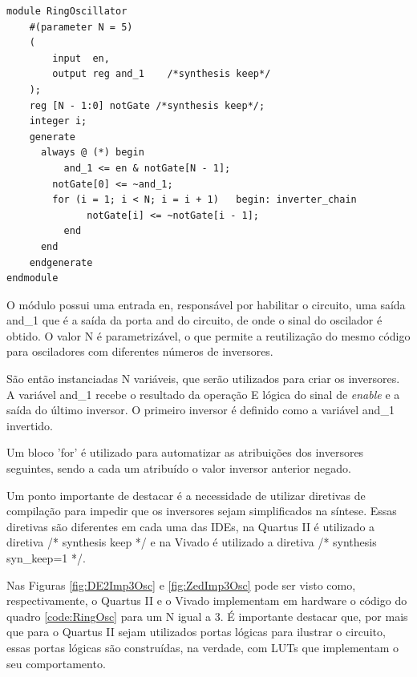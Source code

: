 \begin{lstlisting}[label={code:RingOsc}, style=VerilogStyle, caption={Módulo do Oscilador em Anel. Fonte: O Autor}]
module RingOscillator 
	#(parameter N = 5)
	(
		input  en,
		output reg and_1    /*synthesis keep*/
	);
	reg [N - 1:0] notGate /*synthesis keep*/;
	integer i;
	generate
	  always @ (*) begin
		  and_1 <= en & notGate[N - 1];
	  	notGate[0] <= ~and_1;
	  	for (i = 1; i < N; i = i + 1)   begin: inverter_chain
			  notGate[i] <= ~notGate[i - 1];
		  end
	  end
	endgenerate
endmodule
\end{lstlisting}

O módulo possui uma entrada en, responsável por habilitar o circuito, uma saída and\_1 que é a saída da porta and do circuito, de onde o sinal do oscilador é obtido. O valor N é parametrizável, o que permite a reutilização do mesmo código para osciladores com diferentes números de inversores.

São então instanciadas N variáveis, que serão utilizados para criar os inversores. A variável and\_1 recebe o resultado da operação E lógica do sinal de \textit{enable} e a saída do último inversor. O primeiro inversor é definido como a variável and\_1 invertido.

Um bloco 'for' é utilizado para automatizar as atribuições dos inversores seguintes, sendo a cada um atribuído o valor inversor anterior negado.

Um ponto importante de destacar é a necessidade de utilizar diretivas de compilação para impedir que os inversores sejam simplificados na síntese. Essas diretivas são diferentes em cada uma das IDEs, na Quartus II é utilizado a diretiva /* synthesis keep */ e na Vivado é utilizado a diretiva /* synthesis syn\_keep=1 */.


Nas Figuras \ref{fig:DE2Imp3Osc} e \ref{fig:ZedImp3Osc} pode ser visto como, respectivamente, o Quartus II e o Vivado implementam em hardware o código do quadro \ref{code:RingOsc} para um N igual a 3. É importante destacar que, por mais que para o Quartus II sejam utilizados portas lógicas para ilustrar o circuito, essas portas lógicas são construídas, na verdade, com LUTs que implementam o seu comportamento.


